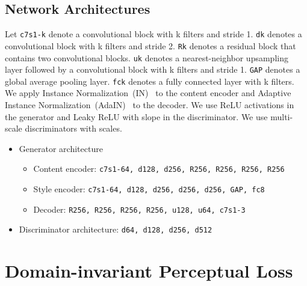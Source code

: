 \documentclass[runningheads]{llncs}
\begin{document}
\subsection{Network Architectures}
	Let \texttt{c7s1-k} denote a  convolutional block with k filters and stride 1. \texttt{dk} denotes a  convolutional block with k filters and stride 2. \texttt{Rk} denotes a residual block that contains two  convolutional blocks. \texttt{uk} denotes a  nearest-neighbor upsampling layer followed by a  convolutional block with k filters and stride 1. \texttt{GAP} denotes a global average pooling layer. \texttt{fck} denotes a fully connected layer with k filters. We apply Instance Normalization~(IN)~\cite{ulyanov2017improved} to the content encoder and Adaptive Instance Normalization~(AdaIN)~\cite{huang2017adain} to the decoder. We use ReLU activations in the generator and Leaky ReLU with slope  in the discriminator. We use multi-scale discriminators with  scales.
	\begin{itemize}
		\item Generator architecture
		\begin{itemize} 
			\item Content encoder: \texttt{c7s1-64, d128, d256, R256, R256, R256, R256}
			\item Style encoder: \texttt{c7s1-64, d128, d256, d256, d256, GAP, fc8}
			\item Decoder: \texttt{R256, R256, R256, R256, u128, u64, c7s1-3}
		\end{itemize}
		\item Discriminator architecture: \texttt{d64, d128, d256, d512}
	\end{itemize}
	
	\section{Domain-invariant Perceptual Loss}
	\label{app:perceptual}
\end{document}
